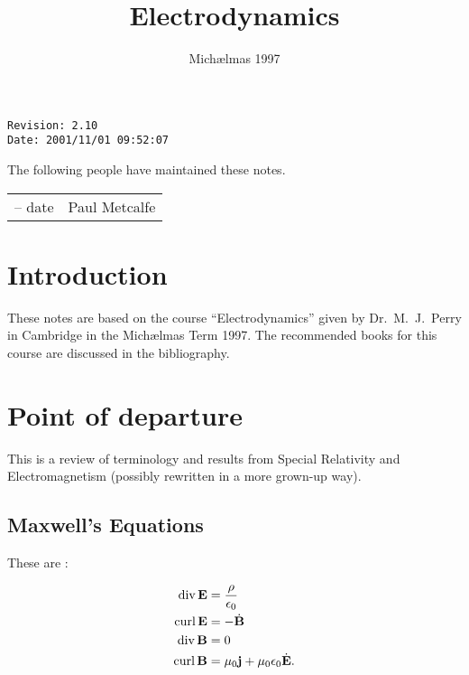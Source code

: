\documentclass{notes}
\newcommand{\B}{\vect{B}}
\newcommand{\E}{\vect{E}}
\newcommand{\jc}{\vect{j}}
\DeclareMathOperator{\curl}{curl}
\DeclareMathOperator{\dive}{div}
\begin{document}
\frontmatter

\title{Electrodynamics}
\date{Mich\ae lmas 1997} \maketitle

\thispagestyle{empty}
\noindent\verb$Revision: 2.10 $\hfill\\
\noindent\verb$Date: 2001/11/01 09:52:07 $\hfill

\vspace{1.5in}

The following people have maintained these notes.

\begin{center}
\begin{tabular}{ r  l}
-- date & Paul Metcalfe
\end{tabular}
\end{center}

\tableofcontents

\chapter{Introduction}

These notes are based on the course ``Electrodynamics'' given by
Dr.~M.~J.~Perry in Cambridge in the Mich\ae lmas Term 1997.  The
recommended books for this course are discussed in the bibliography.

\alsoavailable
\archimcopyright

\mainmatter

\chapter{Point of departure}

This is a review of terminology and results from Special Relativity and
Electromagnetism (possibly rewritten in a more grown-up way).

\section{Maxwell's Equations}

These are :

\begin{align*}
\dive \E &= \frac{\rho}{\epsilon_0} \\
\curl \E &= - \dot{\B} \\
\dive \B &= 0 \\
\curl \B &= \mu_0 \jc + \mu_0 \epsilon_0 \dot{\E}.
\end{align*}
\end{document}
